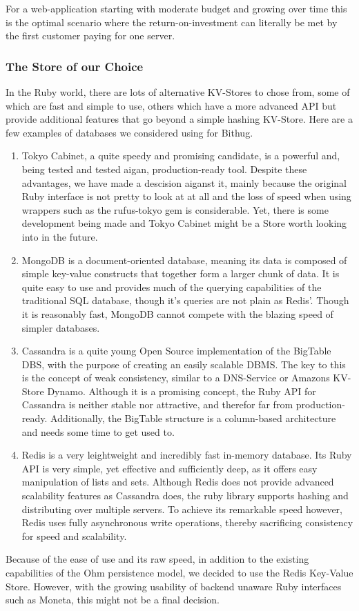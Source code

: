 For a web-application starting with
moderate budget and growing over time this is the optimal scenario where the 
return-on-investment can literally be met by the first customer paying for one 
server.

\subsubsection{The Store of our Choice}
In the Ruby world, there are lots of alternative KV-Stores to chose from, some of which 
are fast and simple to use, others which have a more advanced API but provide 
additional features that go beyond a simple hashing KV-Store. Here are a few 
examples of databases we considered using for Bithug.
\begin{enumerate}
  \item
    Tokyo Cabinet, a quite speedy\cite{tcbench} and promising candidate, 
    is a powerful and, being tested and tested aigan, production-ready tool.
    Despite these advantages, we have made a descision aiganst it, mainly because 
    the original Ruby interface is not pretty to look at at all and the loss of 
    speed when using wrappers such as the rufus-tokyo gem is considerable. 
    Yet, there is some development being made and Tokyo Cabinet might be a 
    Store worth looking into in the future.
  \item
    MongoDB is a document-oriented database, meaning its data is composed of simple 
    key-value constructs that together form a larger chunk of data. It is quite 
    easy to use and provides much of the querying capabilities of the traditional 
    SQL database, though it's queries are not plain as Redis'. Though it is 
    reasonably fast, MongoDB cannot compete with the blazing speed of simpler 
    databases.
  \item
    Cassandra is a quite young Open Source implementation of the BigTable DBS\cite{chang2006bigtable}, 
    with the purpose of creating an easily scalable DBMS. The key to this is 
    the concept of weak consistency, similar to a DNS-Service or 
    Amazons KV-Store Dynamo\cite{decandia2007dynamo}.
    Although it is a promising concept, the Ruby API for Cassandra is neither stable 
    nor attractive, and therefor far from production-ready. Additionally, the 
    BigTable structure is a column-based architecture and needs some time to get 
    used to.
  \item
    Redis is a very leightweight and incredibly fast\cite{haines2009redis} 
    in-memory database. Its Ruby API is very simple, yet effective and 
    sufficiently deep, as it offers easy manipulation of lists and sets. 
    Although Redis does not provide advanced scalability features as Cassandra 
    does, the ruby library supports hashing and distributing over multiple 
    servers. To achieve its remarkable speed however, Redis uses fully 
    asynchronous write operations, thereby sacrificing consistency for speed 
    and scalability.
\end{enumerate}

Because of the ease of use and its raw speed, in addition to the existing 
capabilities of the Ohm persistence model, we decided to use the Redis 
Key-Value Store. However, with the growing usability of backend unaware Ruby 
interfaces such as Moneta, this might not be a final decision.
